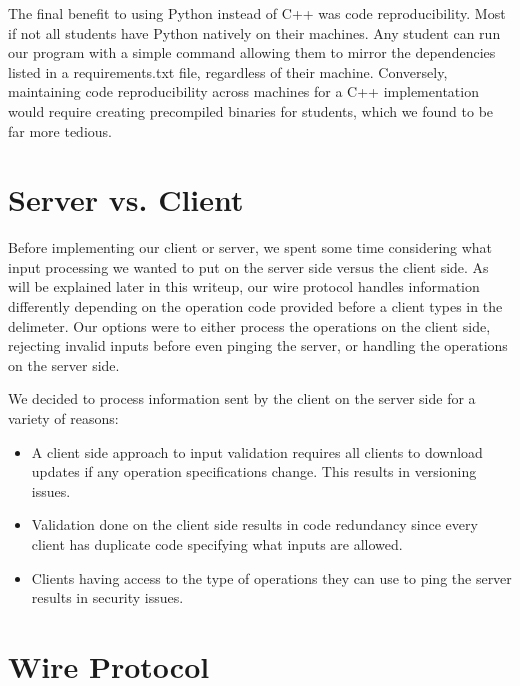 \documentclass[
	a4paper, %
	10pt, %
	unnumberedsections, %
	twoside, %
]{LTJournalArticle}
\begin{document}
The final benefit to using Python instead of C++ was code reproducibility. Most if not all students have Python natively on their machines. Any student can run our program with a simple command allowing them to mirror the dependencies listed in a requirements.txt file, regardless of their machine. Conversely, maintaining code reproducibility across machines for a C++ implementation would require creating precompiled binaries for students, which we found to be far more tedious. 

\section{Server vs. Client}

Before implementing our client or server, we spent some time considering what input processing we wanted to put on the server side versus the client side. As will be explained later in this writeup, our wire protocol handles information differently depending on the operation code provided before a client types in the delimeter. Our options were to either process the operations on the client side, rejecting invalid inputs before even pinging the server, or handling the operations on the server side. 

We decided to process information sent by the client on the server side for a variety of reasons:
\begin{itemize}
    \item A client side approach to input validation requires all clients to download updates if any operation specifications change. This results in versioning issues. 
    \item Validation done on the client side results in code redundancy since every client has duplicate code specifying what inputs are allowed. 
    \item Clients having access to the type of operations they can use to ping the server results in security issues. 
\end{itemize}

\section{Wire Protocol}
\end{document}
